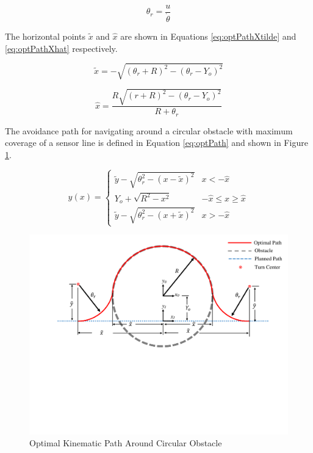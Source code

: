 \documentclass[conf]{new-aiaa}
\begin{document}
\begin{equation}
\label{eq:turnRadius}
\theta_r = \frac{u}{\dot{\theta}}
\end{equation}

The horizontal points $\tilde{x}$ and $\hat{x}$ are shown in Equations \ref{eq:optPathXtilde} and \ref{eq:optPathXhat} respectively. 

\begin{equation}
\label{eq:optPathXtilde}
\widetilde{x} = -\sqrt{(\theta_r+R)^2 - (\theta_r-Y_o)^2}
\end{equation}

\begin{equation}
\label{eq:optPathXhat}
\hat{x} = \frac{R\sqrt{(r+R)^2-(\theta_r-Y_o)^2}}{R+\theta_r}
\end{equation}

The avoidance path for navigating around a circular obstacle with maximum coverage of a sensor line is defined in Equation \ref{eq:optPath} and shown in Figure \ref{fig:optimalpath}.


\begin{equation}
\label{eq:optPath}
y(x) = \left\{
\begin{array}{ll}
\widetilde{y} -\sqrt{\theta_r^2 - (x-\widetilde{x})^2} &  x < -\hat{x} \\
Y_o +\sqrt{R^2 - x^2} & -\hat{x} \leq x \geq \hat{x}\\
\widetilde{y} -\sqrt{\theta_r^2 - (x+\widetilde{x})^2}&  x > -\hat{x}
\end{array}
\right.
\end{equation}

\begin{figure}[H]
	\centering
	\includegraphics[width=0.7\linewidth ,trim=0 265 0 20,clip,width=15cm]{Figures/optimalPath/optimalPath}
	\caption{Optimal Kinematic Path Around Circular Obstacle}
	\label{fig:optimalpath}
\end{figure}
\end{document}
